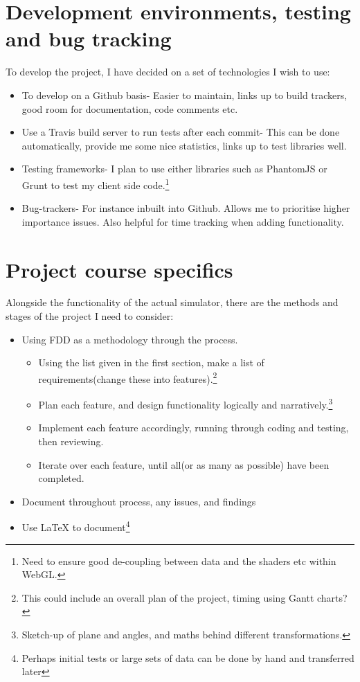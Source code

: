 \documentclass{tufte-handout}
\begin{document}
\section{Development environments, testing and bug tracking}
To develop the project, I have decided on a set of technologies I wish to use:
\begin{itemize}
\item To develop on a Github basis- Easier to maintain, links up to build trackers, good room for documentation, code comments etc.
\item Use a Travis build server to run tests after each commit- This can be done automatically, provide me some nice statistics, links up to test libraries well.
\item Testing frameworks- I plan to use either libraries such as PhantomJS or Grunt to test my client side code.\footnote{Need to ensure good de-coupling between data and the shaders etc within WebGL.}
\item Bug-trackers- For instance inbuilt into Github. Allows me to prioritise higher importance issues. Also helpful for time tracking when adding functionality.
\end{itemize}

\section{Project course specifics}
Alongside the functionality of the actual simulator, there are the methods and stages of the project I need to consider:
\begin{itemize}
\item Using FDD as a methodology through the process.
    \begin{itemize}
    \item Using the list given in the first section, make a list of requirements(change these into features).\footnote{This could include an overall plan of the project, timing using Gantt charts?}
    \item Plan each feature, and design functionality logically and narratively.\footnote{Sketch-up of plane and angles, and maths behind different transformations.} 
    \item Implement each feature accordingly, running through coding and testing, then reviewing.
    \item Iterate over each feature, until all(or as many as possible) have been completed.
    \end{itemize}
\item Document throughout process, any issues, and findings
\item Use LaTeX to document\footnote{Perhaps initial tests or large sets of data can be done by hand and transferred later}
\end{itemize}
\end{document}
